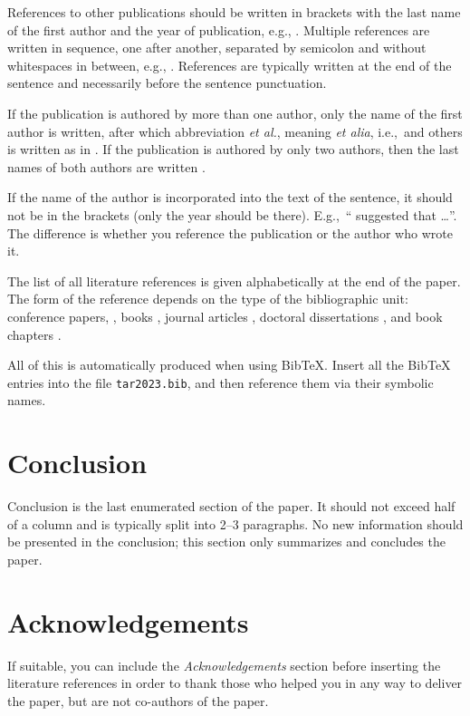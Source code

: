 \documentclass[10pt, a4paper]{article}
\begin{document}
References to other publications should be written in brackets with the last name of the first author and the year of publication, e.g., \citep{chomsky-73}.  Multiple references are written in sequence, one after another, separated by semicolon and without whitespaces in between, e.g., \citep{chomsky-73,chave-64,feigl-58}. References are typically written at the end of the sentence and necessarily before the sentence punctuation.

If the publication is authored by more than one author, only the name of the first author is written, after which abbreviation \emph{et al.}, meaning \emph{et alia}, i.e.,~and others is written as in \citep{johnson-etc}. If the publication is authored by only two authors, then the last names of both authors are written \citep{johnson-howells}.

If the name of the author is incorporated into the text of the sentence, it should not be in the brackets (only the year should be there). E.g.,~``\citet{chomsky-73}
suggested that \dots''. The difference is whether you reference the publication or the author who wrote it. 

The list of all literature references is given alphabetically at the end of the paper. The form of the reference depends on the type of the bibliographic unit: conference papers,
\citep{chave-64}, books \citep{butcher-81}, journal articles
\citep{howells-51}, doctoral dissertations \citep{croft-78}, and book chapters \citep{feigl-58}. 

All of this is automatically produced when using BibTeX. Insert all the BibTeX entries into the file \texttt{tar2023.bib}, and then reference them via their symbolic names.

\section{Conclusion}

Conclusion is the last enumerated section of the paper. It should not exceed half of a column and is typically split into 2--3 paragraphs. No new information should be presented in the conclusion; this section only summarizes and concludes the paper.

\section*{Acknowledgements}

If suitable, you can include the \textit{Acknowledgements} section before inserting the literature references  in order to thank those who helped you in any way to deliver the paper, but are not co-authors of the paper.


 
\end{document}
